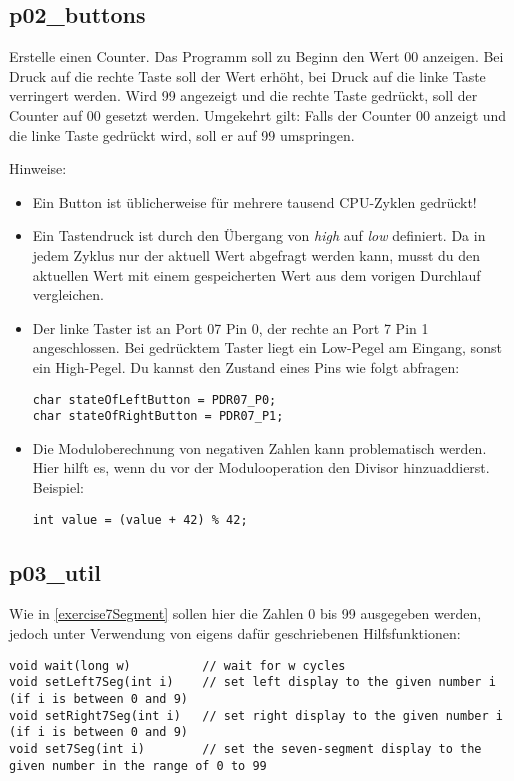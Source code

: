 \documentclass[
  accentcolor=tud1c,	%
  colorbacktitle,		%
  inverttitle,			%
  german,				%
  twoside
]{tudexercise}
\begin{document}
\subsection{p02\_buttons}
Erstelle einen Counter.
Das Programm soll zu Beginn den Wert 00 anzeigen.
Bei Druck auf die rechte Taste soll der Wert erhöht, bei Druck auf die linke Taste verringert werden.
Wird 99 angezeigt und die rechte Taste gedrückt, soll der Counter auf 00 gesetzt werden.
Umgekehrt gilt:
Falls der Counter 00 anzeigt und die linke Taste gedrückt wird, soll er auf 99 umspringen.

Hinweise:\begin{itemize}
\item
Ein Button ist üblicherweise für mehrere tausend CPU-Zyklen gedrückt!

\item
Ein Tastendruck ist durch den Übergang von \emph{high} auf \emph{low} definiert.
Da in jedem Zyklus nur der aktuell Wert abgefragt werden kann, musst du den aktuellen Wert mit einem gespeicherten Wert aus dem vorigen Durchlauf vergleichen.

\item
Der linke Taster ist an Port 07 Pin 0, der rechte an Port 7 Pin 1 angeschlossen.
Bei gedrücktem Taster liegt ein Low-Pegel am Eingang, sonst ein High-Pegel.
Du kannst den Zustand eines Pins wie folgt abfragen:
\begin{lstlisting}
char stateOfLeftButton = PDR07_P0; 
char stateOfRightButton = PDR07_P1;
\end{lstlisting}

\item
Die Moduloberechnung von negativen Zahlen kann problematisch werden.
Hier hilft es, wenn du vor der Modulooperation den Divisor hinzuaddierst.
Beispiel:
\begin{lstlisting}
int value = (value + 42) % 42;
\end{lstlisting}

\end{itemize}

\subsection{p03\_util}
\label{exercise7SegmentUtil}
Wie in \ref{exercise7Segment} sollen hier die Zahlen 0 bis 99 ausgegeben werden, jedoch unter Verwendung von eigens dafür geschriebenen Hilfsfunktionen:
\begin{lstlisting}
void wait(long w)          // wait for w cycles
void setLeft7Seg(int i)    // set left display to the given number i (if i is between 0 and 9)
void setRight7Seg(int i)   // set right display to the given number i (if i is between 0 and 9)
void set7Seg(int i)        // set the seven-segment display to the given number in the range of 0 to 99
\end{lstlisting}
\end{document}
